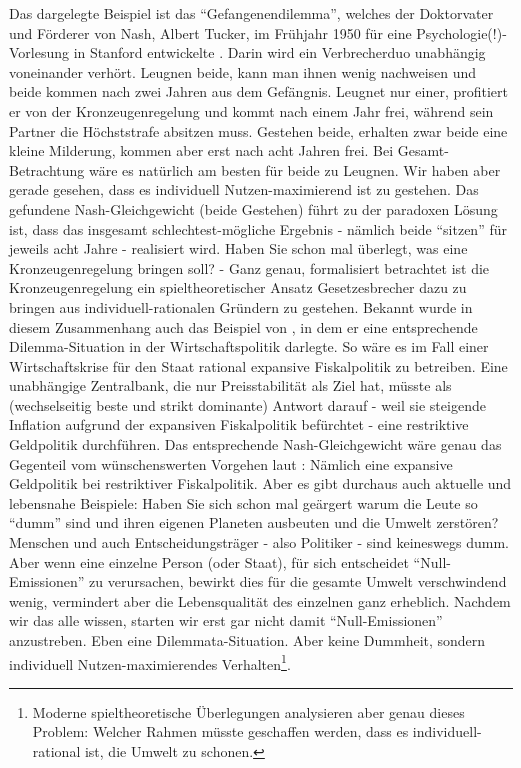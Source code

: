 Das dargelegte Beispiel ist das "`Gefangenendilemma"', welches der Doktorvater und Förderer von Nash, Albert Tucker, im Frühjahr 1950 für eine Psychologie(!)-Vorlesung in Stanford entwickelte \parencite[S. 161]{Nash1994}. Darin wird ein Verbrecherduo unabhängig voneinander verhört. Leugnen beide, kann man ihnen wenig nachweisen und beide kommen nach zwei Jahren aus dem Gefängnis. Leugnet nur einer, profitiert er von der Kronzeugenregelung und kommt nach einem Jahr frei, während sein Partner die Höchststrafe absitzen muss. Gestehen beide, erhalten zwar beide eine kleine Milderung, kommen aber erst nach acht Jahren frei. Bei Gesamt-Betrachtung wäre es natürlich am besten für beide zu Leugnen. Wir haben aber gerade gesehen, dass es individuell Nutzen-maximierend ist zu gestehen. Das gefundene Nash-Gleichgewicht (beide Gestehen) führt zu der paradoxen Lösung ist, dass das insgesamt schlechtest-mögliche Ergebnis - nämlich beide "`sitzen"' für jeweils acht Jahre - realisiert wird. Haben Sie schon mal überlegt, was eine Kronzeugenregelung bringen soll? - Ganz genau, formalisiert betrachtet ist die Kronzeugenregelung ein spieltheoretischer Ansatz Gesetzesbrecher dazu zu bringen aus individuell-rationalen Gründern zu gestehen. Bekannt wurde in diesem Zusammenhang auch das Beispiel von \textcite{Blinder1982}, in dem er eine entsprechende Dilemma-Situation in der Wirtschaftspolitik darlegte. So wäre es im Fall einer Wirtschaftskrise für den Staat rational expansive Fiskalpolitik zu betreiben. Eine unabhängige Zentralbank, die nur Preisstabilität als Ziel hat, müsste als (wechselseitig beste und strikt dominante) Antwort darauf - weil sie steigende Inflation aufgrund der expansiven Fiskalpolitik befürchtet - eine restriktive Geldpolitik durchführen. Das entsprechende Nash-Gleichgewicht wäre genau das Gegenteil vom wünschenswerten Vorgehen laut \textcite{Blinder1982}: Nämlich eine expansive Geldpolitik bei restriktiver Fiskalpolitik. Aber es gibt durchaus auch aktuelle und lebensnahe Beispiele: Haben Sie sich schon mal geärgert warum die Leute so "`dumm"' sind und ihren eigenen Planeten ausbeuten und die Umwelt zerstören? Menschen und auch Entscheidungsträger - also Politiker - sind keineswegs dumm. Aber wenn eine einzelne Person (oder Staat), für sich entscheidet "`Null-Emissionen"' zu verursachen, bewirkt dies für die gesamte Umwelt verschwindend wenig, vermindert aber die Lebensqualität des einzelnen ganz erheblich. Nachdem wir das alle wissen, starten wir erst gar nicht damit "`Null-Emissionen"' anzustreben. Eben eine Dilemmata-Situation. Aber keine Dummheit, sondern individuell Nutzen-maximierendes Verhalten\footnote{Moderne spieltheoretische Überlegungen analysieren aber genau dieses Problem: Welcher Rahmen müsste geschaffen werden, dass es individuell-rational ist, die Umwelt zu schonen.}.

